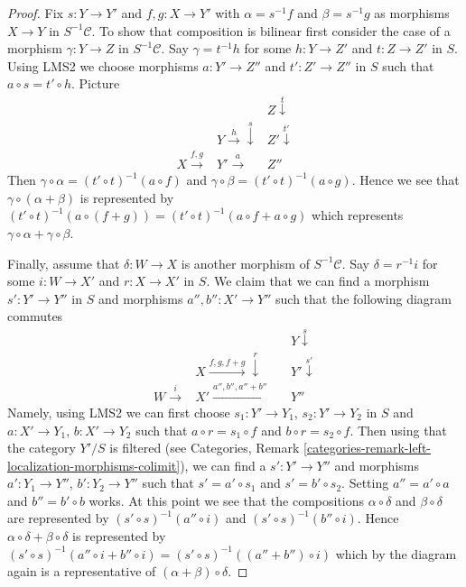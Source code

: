 \begin{proof}
\medskip\noindent
Fix $s : Y \to Y'$ and $f, g : X \to Y'$ with
$\alpha = s^{-1}f$ and $\beta = s^{-1}g$ as morphisms $X \to Y$
in $S^{-1}\mathcal{C}$.
To show that composition is bilinear first consider the case of a
morphism $\gamma : Y \to Z$ in $S^{-1}\mathcal{C}$. Say $\gamma = t^{-1}h$
for some $h : Y \to Z'$ and $t : Z \to Z'$ in $S$. Using LMS2 we
choose morphisms $a : Y' \to Z''$ and $t' : Z' \to Z''$ in $S$ such
that $a \circ s = t' \circ h$. Picture
$$
\begin{array}{ccc} &  & Z \overset{t}{\downarrow} \\  & Y \overset{h}{\longrightarrow}\overset{s}{\downarrow} & Z' \overset{t'}{\downarrow} \\ X \overset{f, g}{\longrightarrow} & Y' \overset{a}{\longrightarrow} & Z''\end{array}
$$
Then
$\gamma \circ \alpha = (t' \circ t)^{-1}(a \circ f)$ and
$\gamma \circ \beta = (t' \circ t)^{-1}(a \circ g)$.
Hence we see that $\gamma \circ (\alpha + \beta)$ is represented
by $(t' \circ t)^{-1}(a \circ (f + g)) =
(t' \circ t)^{-1}(a \circ f + a \circ g)$ which represents
$\gamma \circ \alpha + \gamma \circ \beta$.

\medskip\noindent
Finally, assume that $\delta : W \to X$ is another morphism of
$S^{-1}\mathcal{C}$. Say $\delta = r^{-1}i$ for some
$i : W \to X'$ and $r : X \to X'$ in $S$. We claim that we can find
a morphism $s' : Y' \to Y''$ in $S$ and morphisms $a'', b'' : X' \to Y''$
such that the following diagram commutes
$$
\begin{array}{cccc} &  &  & Y \overset{s}{\downarrow} \\  & X \overset{f, g, f + g}{\longrightarrow}\overset{r}{\downarrow} &  & Y' \overset{s'}{\downarrow} \\ W \overset{i}{\longrightarrow} & X' \overset{a'', b'', a'' + b''}{\longrightarrow} &  & Y''\end{array}
$$
Namely, using LMS2 we can first choose
$s_1 : Y' \to Y_1$, $s_2 : Y' \to Y_2$ in $S$ and
$a : X' \to Y_1$, $b : X' \to Y_2$ such that
$a \circ r = s_1 \circ f$ and $b \circ r = s_2 \circ f$.
Then using that the category $Y'/S$ is filtered (see
Categories, Remark \ref{categories-remark-left-localization-morphisms-colimit}),
we can
find a $s' : Y' \to Y''$ and morphisms $a' : Y_1 \to Y''$, $b' : Y_2 \to Y''$
such that $s' = a' \circ s_1$ and $s' = b' \circ s_2$. Setting
$a'' = a' \circ a$ and $b'' = b' \circ b$ works.
At this point we see that the compositions
$\alpha \circ \delta$ and $\beta \circ \delta$ are represented by
$(s' \circ s)^{-1}(a'' \circ i)$ and $(s' \circ s)^{-1}(b'' \circ i)$.
Hence $\alpha \circ \delta + \beta \circ \delta$ is represented
by $(s' \circ s)^{-1}(a'' \circ i + b'' \circ i) =
(s' \circ s)^{-1}((a'' + b'') \circ i)$
which by the diagram again is a representative
of $(\alpha + \beta) \circ \delta$.
\end{proof}


